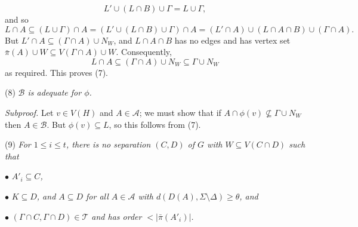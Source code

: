 \begin{equation*}
L' \cup (L \cap B) \cup \Gamma = L \cup \Gamma,
\end{equation*}
and so
\begin{equation*}
L \cap A \subseteq (L \cup \Gamma) \cap A = (L' \cup (L \cap B) \cup \Gamma) \cap A = (L' \cap A) \cup (L \cap A \cap B) \cup (\Gamma \cap A).
\end{equation*}
But $L' \cap A \subseteq (\Gamma \cap A) \cup N_W$, and $L \cap A \cap B$ has no edges and has vertex set $\bar{\pi}(A) \cup W \subseteq V(\Gamma \cap A) \cup W$. Consequently,
\begin{equation*}
L \cap A \subseteq (\Gamma \cap A) \cup N_W \subseteq \Gamma \cup N_W
\end{equation*}
as required. This proves (7).

\hspace*{12pt}(8) \textit{$\mathcal{B}$ is adequate for $\phi$.}

\textit{Subproof.} Let $v \in V(H)$ and $A \in \mathcal{A}$; we must show that if $A \cap \phi(v) \not\subseteq \Gamma \cup N_W$ then $A \in \mathcal{B}$. But $\phi(v) \subseteq L$, so this follows from (7).

\hspace*{12pt}(9) \textit{For $1 \le i \le t$, there is no separation $(C, D)$ of $G$ with $W \subseteq V(C \cap D)$ such that}

\hspace*{12pt}$\bullet$ \textit{$A'_i \subseteq C$,}

\hspace*{12pt}$\bullet$ \textit{$K \subseteq D$, and $A \subseteq D$ for all $A \in \mathcal{A}$ with $d(D(A), \Sigma \setminus \Delta) \ge \theta$, and}

\hspace*{12pt}$\bullet$ \textit{$(\Gamma \cap C, \Gamma \cap D) \in \mathcal{T}$ and has order $< |\bar{\pi}(A'_i)|$.}

